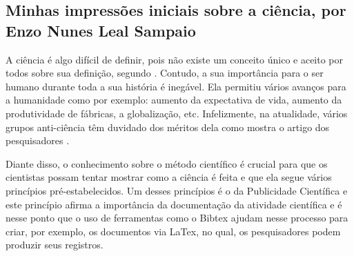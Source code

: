 \subsection{Minhas impressões iniciais sobre a ciência, por Enzo Nunes Leal Sampaio}


A ciência é algo difícil de definir, pois não existe um conceito único e aceito por todos sobre sua definição, segundo \citet{schwartzman_ciencia_1984}. Contudo, a sua importância para o ser humano durante toda a sua história é inegável. Ela permitiu vários avanços para a humanidade como por exemplo: aumento da expectativa de vida, aumento da produtividade de fábricas, a globalização, etc. Infelizmente, na atualidade, vários grupos anti-ciência têm duvidado dos méritos dela como mostra o artigo dos pesquisadores \citet{scherma_relatos_2020}.

Diante disso, o conhecimento sobre o método científico é crucial para que os cientistas possam tentar mostrar como a ciência é feita e que ela segue vários princípios pré-estabelecidos. Um desses princípios é o da Publicidade Científica e este princípio afirma a importância da documentação da atividade científica e é nesse ponto que o uso de ferramentas como o \gls{Bibtex} ajudam nesse processo para criar, por exemplo, os documentos via LaTex, no qual, os pesquisadores podem produzir seus registros.